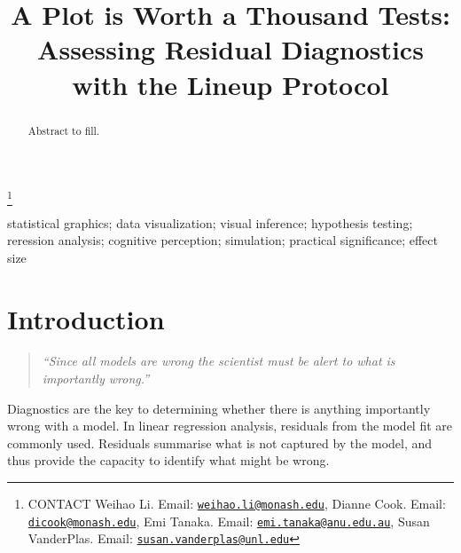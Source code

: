 \documentclass[]{interact}
\theoremstyle{plain}%
\theoremstyle{definition}
\theoremstyle{remark}
\begin{document}

\title{A Plot is Worth a Thousand Tests: Assessing Residual Diagnostics
with the Lineup Protocol}


\author{
}

\thanks{CONTACT Weihao
Li. Email: \href{mailto:weihao.li@monash.edu}{\nolinkurl{weihao.li@monash.edu}}, Dianne
Cook. Email: \href{mailto:dicook@monash.edu}{\nolinkurl{dicook@monash.edu}}, Emi
Tanaka. Email: \href{mailto:emi.tanaka@anu.edu.au}{\nolinkurl{emi.tanaka@anu.edu.au}}, Susan
VanderPlas. Email: \href{mailto:susan.vanderplas@unl.edu}{\nolinkurl{susan.vanderplas@unl.edu}}}

\maketitle

\begin{abstract}
Abstract to fill.
\end{abstract}

\begin{keywords}
statistical graphics; data visualization; visual inference; hypothesis
testing; reression analysis; cognitive perception; simulation; practical
significance; effect size
\end{keywords}

\hypertarget{introduction}{%
\section{Introduction}\label{introduction}}

\begin{quote}
\emph{``Since all models are wrong the scientist must be alert to what
is importantly wrong.''} \citep{box1976science}
\end{quote}

Diagnostics are the key to determining whether there is anything
importantly wrong with a model. In linear regression analysis, residuals
from the model fit are commonly used. Residuals summarise what is not
captured by the model, and thus provide the capacity to identify what
might be wrong.
\end{document}
